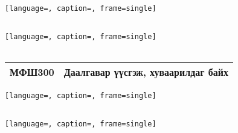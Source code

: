 \begin{lstlisting}[language=, caption=, frame=single]
    
\end{lstlisting}

\begin{lstlisting}[language=, caption=, frame=single]
    
\end{lstlisting}







\begin{table}[H]
    \centering
    \label{my-label-3}
    \begin{tabular}{|p{1.7cm}|p{12cm}|}
        \hline
          МФШ300 & Даалгавар үүсгэж, хуваарилдаг байх\\ \hline
    \end{tabular}
\end{table}

\begin{lstlisting}[language=, caption=, frame=single]
    
\end{lstlisting}

\begin{lstlisting}[language=, caption=, frame=single]
    
\end{lstlisting}


